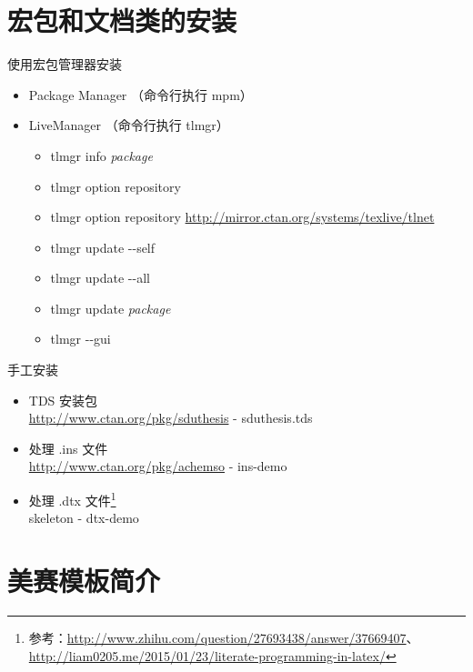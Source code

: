 \documentclass{beamer}
\renewcommand{\TeX}{\hologo{TeX}}
\newcommand{\MiKTeX}{\hologo{MiKTeX}}
\newcommand{\TeXLive}{\TeX{} Live}
\newcommand{\file}{\textsf}
\begin{document}
\section{宏包和文档类的安装}

\begin{frame}
\end{frame}


\begin{frame}{使用宏包管理器安装}
  \begin{itemize}
    \item \MiKTeX{} Package Manager （命令行执行 mpm）\pause
    \item \TeXLive Manager （命令行执行 tlmgr）
    \begin{itemize}
      \item tlmgr info \emph{package}\pause
      \item tlmgr option repository
      \item tlmgr option repository \url{http://mirror.ctan.org/systems/texlive/tlnet}\pause
      \item tlmgr update -{}-self
      \item tlmgr update -{}-all
      \item tlmgr update \emph{package}\pause
      \item tlmgr -{}-gui
    \end{itemize}
  \end{itemize}
\end{frame}

\begin{frame}{手工安装}
  \begin{itemize}
    \item TDS 安装包\\
    \url{http://www.ctan.org/pkg/sduthesis} - sduthesis.tds\pause
    \item 处理 \file{.ins} 文件\\
    \url{http://www.ctan.org/pkg/achemso} - ins-demo\pause
    \item 处理 \file{.dtx} 文件\footnote{参考：\url{http://www.zhihu.com/question/27693438/answer/37669407}、\\\qquad\url{http://liam0205.me/2015/01/23/literate-programming-in-latex/}}\\
    skeleton - dtx-demo
  \end{itemize}
\end{frame}

\section{美赛模板简介}
\end{document}
